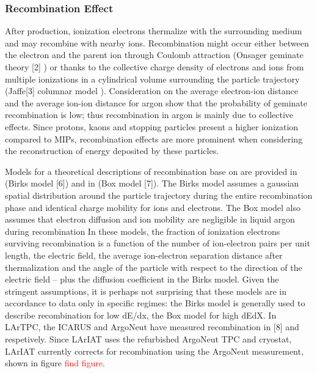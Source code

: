 

\subsubsection{Recombination Effect}
After production, ionization electrons thermalize with the surrounding medium and may recombine with nearby ions. Recombination might occur either between the electron and the parent ion through Coulomb attraction (Onsager geminate theory  [2] ) or thanks to the collective charge density of electrons and ions from multiple ionizations in a cylindrical volume surrounding the particle trajectory (Jaffe[3]  columnar model ). 
Consideration on the  average electron-ion distance and the average ion-ion distance for argon show that the probability of geminate recombination is low; thus recombination in argon is mainly due to collective effects\cite{1748-0221-8-08-P08005}.  Since protons, kaons and stopping particles present a higher ionization compared to MIPs, recombination effects are more prominent when considering the reconstruction of energy deposited by these particles.

Models for a theoretical descriptions of recombination base on are provided in (Birks model [6]) and in (Box model [7]). The Birks model assumes a gaussian spatial distribution around the particle trajectory during the entire recombination phase and identical charge mobility for ions and electrons. The Box model also assumes that electron diffusion and ion mobility are negligible in liquid argon during recombination
In these models, the fraction of ionization electrons surviving recombination is a function of the number of ion-electron pairs per unit length, the electric field, the average ion-electron separation distance after thermalization and the angle of the particle with respect to the direction of the electric field -- plus the diffusion coefficient in the Birks model. Given the stringent assumptions, it is perhaps  not surprising that these models are in accordance to data only in specific regimes: the Birks model is generally used to describe recombination for low dE/dx, the Box model for high dEdX.
In LArTPC, the ICARUS and ArgoNeut have measured recombination in [8] and \cite{1748-0221-8-08-P08005} respetively. Since LArIAT uses the refurbished ArgoNeut TPC and cryostat,  LArIAT currently corrects for recombination using the ArgoNeut measurement, shown in figure \textcolor{red}{find figure}.


